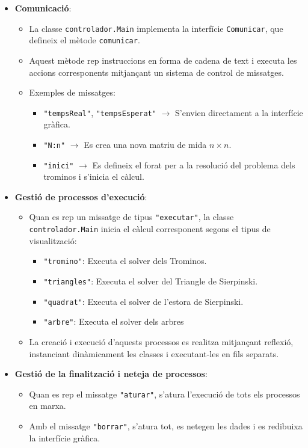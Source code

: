 \documentclass{ieeetj}
\begin{document}
\begin{itemize}
\begin{itemize}
    \item \textbf{Comunicació}:
    \begin{itemize}
        \item La classe \texttt{controlador.Main} implementa la interfície \texttt{Comunicar}, que defineix el mètode \texttt{comunicar}.
        \item Aquest mètode rep instruccions en forma de cadena de text i executa les accions corresponents mitjançant un sistema de control de missatges.
        \item Exemples de missatges:
            \begin{itemize}
                \item \texttt{"tempsReal"}, \texttt{"tempsEsperat"} $\rightarrow$ S'envien directament a la interfície gràfica.
                \item \texttt{"N:n"} $\rightarrow$ Es crea una nova matriu de mida \(n \times n\).
                \item \texttt{"inici"} $\rightarrow$ Es defineix el forat per a la resolució del problema dels trominos i s'inicia el càlcul.
            \end{itemize}
    \end{itemize}
    
    \item \textbf{Gestió de processos d'execució}:
    \begin{itemize}
        \item Quan es rep un missatge de tipus \texttt{"executar"}, la classe \texttt{controlador.Main} inicia el càlcul corresponent segons el tipus de visualització:
        \begin{itemize}
            \item \texttt{"tromino"}: Executa el solver dels Trominos.
            \item \texttt{"triangles"}: Executa el solver del Triangle de Sierpinski.
            \item \texttt{"quadrat"}: Executa el solver de l'estora de Sierpinski.
            \item \texttt{"arbre"}:  Executa el solver dels arbres
        \end{itemize}
        \item La creació i execució d'aquests processos es realitza mitjançant reflexió, instanciant dinàmicament les classes i executant-les en fils separats.
    \end{itemize}
    
    \item \textbf{Gestió de la finalització i neteja de processos}:
    \begin{itemize}
        \item Quan es rep el missatge \texttt{"aturar"}, s'atura l'execució de tots els processos en marxa.
        \item Amb el missatge \texttt{"borrar"}, s'atura tot, es netegen les dades i es redibuixa la interfície gràfica.
    \end{itemize}


\end{itemize}
\end{itemize}
\end{document}
